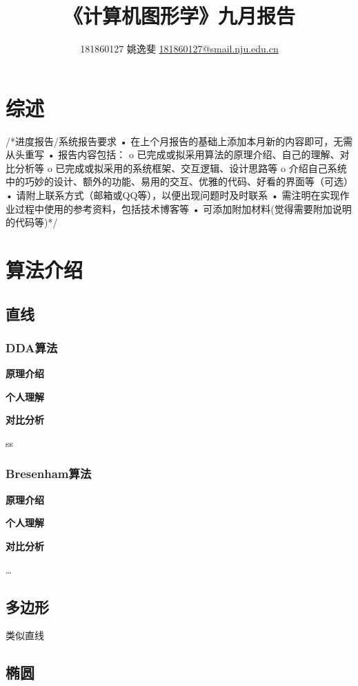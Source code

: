 \documentclass[a4paper,UTF8]{article}
\theoremstyle{definition}
\begin{document}
\title{\textbf{《计算机图形学》九月报告}}
\author{181860127   姚逸斐  \href{mailto:181860127@smail.nju.edu.cn}{181860127@smail.nju.edu.cn}}
\maketitle

\section{综述}
/*进度报告/系统报告要求
•	在上个月报告的基础上添加本月新的内容即可，无需从头重写
•	报告内容包括：
o	已完成或拟采用算法的原理介绍、自己的理解、对比分析等
o	已完成或拟采用的系统框架、交互逻辑、设计思路等
o	介绍自己系统中的巧妙的设计、额外的功能、易用的交互、优雅的代码、好看的界面等（可选）
•	请附上联系方式（邮箱或QQ等），以便出现问题时及时联系
•	需注明在实现作业过程中使用的参考资料，包括技术博客等
•	可添加附加材料(觉得需要附加说明的代码等)*/

\section{算法介绍}
\subsection{直线}

\subsubsection{DDA算法}
\textbf{原理介绍}\par
\cite{GraffZivin2018}
\textbf{个人理解}\par

\textbf{对比分析}\par
ss
\subsubsection{Bresenham算法}
\textbf{原理介绍}\par
\cite{GraffZivin2018}
\textbf{个人理解}\par

\textbf{对比分析}\par

\dots
\subsection{多边形}
类似直线
\subsection{椭圆}
\end{document}

